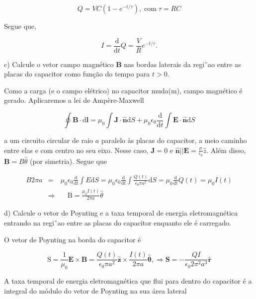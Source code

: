 \begin{enumerate}[start=1,label={\bfseries Q\arabic*.}]
$$
Q=V C\left(1-e^{-t / \tau}\right), \operatorname{com} \tau=R C
$$

Segue que,

$$
I=\frac{\mathrm{d}}{\mathrm{d} t} Q=\frac{V}{R} e^{-t / \tau}.
$$


c) Calcule o vetor campo magnético \textbf{B} nas bordas laterais da regi˜ao entre as placas do capacitor como função do tempo para $t > 0$.

\resposta

Como a carga (e o campo elétrico) no capacitor muda(m), campo magnético é gerado. Aplicaremos a lei de Ampère-Maxwell

$$
\oint \mathbf{B} \cdot \mathrm{d} \mathbf{l}=\mu_{0} \int \mathbf{J} \cdot \hat{\mathbf{n}} \mathrm{d} S+\mu_{0} \epsilon_{0} \frac{\mathrm{d}}{\mathrm{d} t} \int \mathbf{E} \cdot \hat{\mathbf{n}} \mathrm{d} S
$$

a um circuito circular de raio $a$ paralelo às placas do capacitor, a meio caminho entre elas e com centro no seu eixo. Nesse caso, $\mathbf{J} = 0$ e $\hat{\mathbf{n}} || \mathbf{E} = \frac{\sigma}{\epsilon_{0}} \hat{z}$. Além disso, $\mathbf{B} = B\hat{\theta}$ (por simetria). Segue que

\begin{eqnarray*}
B 2 \pi a &=& \mu_{0} \epsilon_{0} \frac{\mathrm{d}}{\mathrm{d} t} \int E \mathrm{d} S=\mu_{0} \epsilon_{0} \frac{\mathrm{d}}{\mathrm{d} t} \int \frac{Q(t)}{\epsilon_{0} \pi a^{2}} \mathrm{d} S=\mu_{0} \frac{\mathrm{d}}{\mathrm{d} t} Q(t)=\mu_{0} I(t) \\
&\Rightarrow & \quad \mathrm{B}=\frac{\mu_{0} I(t)}{2 \pi a} \hat{\theta}
\end{eqnarray*}



d) Calcule o vetor de Poynting e a taxa temporal de energia eletromagnética entrando na regi˜ao entre as placas do capacitor enquanto ele é carregado.

\resposta

O vetor de Poynting na borda do capacitor é

$$
\mathrm{S}=\frac{1}{\mu_{0}} \mathbf{E} \times \mathbf{B}=\frac{Q(t)}{\epsilon_{0} \pi a^{2}} \hat{\mathbf{z}} \times \frac{I(t)}{2 \pi a} \hat{\boldsymbol{\theta}}, \Rightarrow \mathbf{S}=-\frac{Q I}{\epsilon_{0} 2 \pi^{2} a^{3}} \hat{\mathbf{r}}
$$

A taxa temporal de energia eletromagnética que flui para dentro do capacitor é a integral do módulo do vetor de Poynting na sua área lateral


\end{enumerate}
